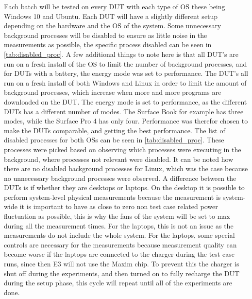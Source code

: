 Each batch will be tested on every DUT with each type of OS these being Windows 10 and Ubuntu. Each DUT will have a slightly different setup depending on the hardware and the OS of the system. Some unnecessary background processes will be disabled to ensure as little noise in the measurements as possible\cite[]{sestoft2013microbenchmarks}, the specific process disabled can be seen in \cref{tab:disabled_proc}. A few additional things to note here is that all DUT's are run on a fresh install of the OS to limit the number of background processes, and for DUTs with a battery, the energy mode was set to performance. The DUT's all run on a fresh install of both Windows and Linux in order to limit the amount of background processes, which increase when more and more programs are downloaded on the DUT. The energy mode is set to performance, as the different DUTs has a different number of modes. The Surface Book for example has three modes, while the Surface Pro 4 has only four. Performance was therefor chosen to make the DUTs comparable, and getting the best performance. The list of disabled processes for both OSs can be seen in \cref{tab:disabled_proc}. These processes were picked based on observing which processes were executing in the background, where processes not relevant were disabled. It can be noted how there are no disabled background processes for Linux, which was the case because no unnecessary background processes were observed. A difference between the DUTs is if whether they are desktops or laptops. On the desktop it is possible to perform system-level physical measurements because the measurement is system-wide it is important to have as close to zero non test case related power fluctuation as possible, this is why the fans of the system will be set to max during all the measurement times. For the laptops, this is not an issue as the measurements do not include the whole system. For the laptops, some special controls are necessary for the measurements because measurement quality can become worse if the laptops are connected to the charger during the test case runs, since then E3 will not use the Maxim chip\cite{E3Video}. To prevent this the charger is shut off during the experiments, and then turned on to fully recharge the DUT during the setup phase, this cycle will repeat until all of the experiments are done.


